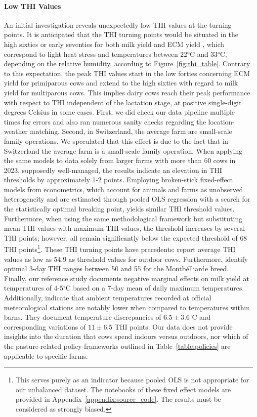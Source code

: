 \paragraph{Low THI Values} An initial investigation reveals unexpectedly low THI values at the turning points. It is anticipated that the THI turning points would be situated in the high sixties or early seventies for both milk yield and ECM yield \citep{armstrong_heat_1994, de_rensis_seasonal_2015, vroege_effects_2023}, which correspond to light heat stress and temperatures between 22°C and 33°C, depending on the relative humidity, according to Figure~\ref{fig:thi_table}. Contrary to this expectation, the peak THI values start in the low forties concerning ECM yield for primiparous cows and extend to the high sixties with regard to milk yield for multiparous cows. This implies dairy cows reach their peak performance with respect to THI independent of the lactation stage, at positive single-digit degrees Celsius in some cases. First, we did check our data pipeline multiple times for errors and also ran numerous sanity checks regarding the location-weather matching. Second, in Switzerland, the average farm are small-scale family operations. We speculated that this effect is due to the fact that in Switzerland the average farm is a small-scale family operation. When applying the same models to data solely from larger farms with more than 60 cows in 2023, supposedly well-managed, the results indicate an elevation in THI thresholds by approximately 1-2 points. Employing broken-stick fixed-effect models from econometrics, which account for animals and farms as unobserved heterogeneity and are estimated through pooled OLS regression with a search for the statistically optimal breaking point, yields similar THI threshold values. Furthermore, when using the same methodological framework but substituting mean THI values with maximum THI values, the threshold increases by several THI points; however, all remain significantly below the expected threshold of 68 THI points\footnote{This serves purely as an indicator because pooled OLS is not appropriate for our unbalanced dataset. The notebooks of these fixed effect models are provided in Appendix~\ref{appendix:source_code}. The results must be considered as strongly biased.}. These THI turning points have precedents: \cite{hill_dairy_2015} report average THI values as low as 54.9 as threshold values for outdoor cows. Furthermore, \cite{vinet_estimation_2023} identify optimal 3-day THI ranges between 50 and 55 for the Montbélliarde breed. Finally, our reference study \cite{ahmed_temperature_2022} documents negative marginal effects on milk yield at temperatures of 4-5$^\circ$C based on a 7-day mean of daily maximum temperatures. Additionally, \cite{schuller_short_2013} indicate that ambient temperatures recorded at official meteorological stations are notably lower when compared to temperatures within barns. They document temperature discrepancies of $6.5 \pm 3.6^\circ$C and corresponding variations of $11 \pm 6.5$ THI points. Our data does not provide insights into the duration that cows spend indoors versus outdoors, nor which of the pasture-related policy frameworks outlined in Table~\ref{table:policies} are applicable to specific farms.

